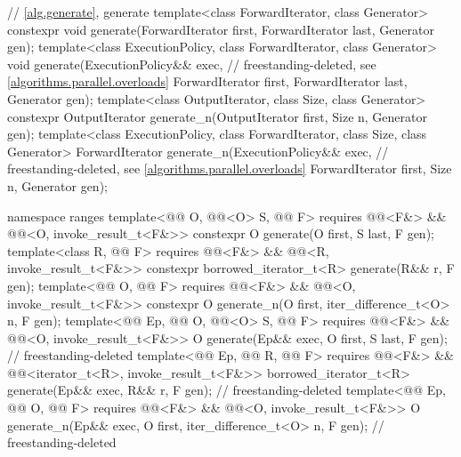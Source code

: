 \begin{codeblock}
{  // \ref{alg.generate}, generate
  template<class ForwardIterator, class Generator>
    constexpr void generate(ForwardIterator first, ForwardIterator last,
                            Generator gen);
  template<class ExecutionPolicy, class ForwardIterator, class Generator>
    void generate(ExecutionPolicy&& exec,                       // freestanding-deleted, see \ref{algorithms.parallel.overloads}
                  ForwardIterator first, ForwardIterator last,
                  Generator gen);
  template<class OutputIterator, class Size, class Generator>
    constexpr OutputIterator generate_n(OutputIterator first, Size n, Generator gen);
  template<class ExecutionPolicy, class ForwardIterator, class Size, class Generator>
    ForwardIterator generate_n(ExecutionPolicy&& exec,          // freestanding-deleted, see \ref{algorithms.parallel.overloads}
                               ForwardIterator first, Size n, Generator gen);

  namespace ranges {
    template<@@ O, @@<O> S, @@ F>
      requires @@<F&> && @@<O, invoke_result_t<F&>>
      constexpr O generate(O first, S last, F gen);
    template<class R, @@ F>
      requires @@<F&> && @@<R, invoke_result_t<F&>>
      constexpr borrowed_iterator_t<R> generate(R&& r, F gen);
    template<@@ O, @@ F>
      requires @@<F&> && @@<O, invoke_result_t<F&>>
      constexpr O generate_n(O first, iter_difference_t<O> n, F gen);
    template<@@ Ep, @@ O, @@<O> S,
             @@ F>
      requires @@<F&> && @@<O, invoke_result_t<F&>>
      O generate(Ep&& exec, O first, S last, F gen);                        // freestanding-deleted
    template<@@ Ep, @@ R, @@ F>
      requires @@<F&> && @@<iterator_t<R>, invoke_result_t<F&>>
      borrowed_iterator_t<R> generate(Ep&& exec, R&& r, F gen);             // freestanding-deleted
    template<@@ Ep, @@ O, @@ F>
      requires @@<F&> && @@<O, invoke_result_t<F&>>
      O generate_n(Ep&& exec, O first, iter_difference_t<O> n, F gen);      // freestanding-deleted
  }

}
\end{codeblock}
